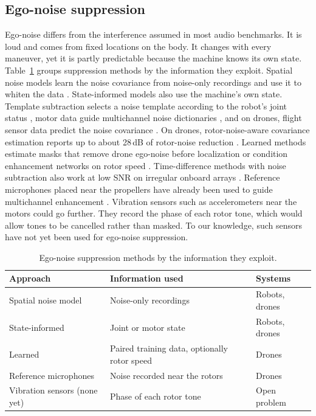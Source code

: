 \documentclass{svproc}
\begin{document}
\subsection{Ego-noise suppression}
Ego-noise differs from the interference assumed in most audio benchmarks.
It is loud and comes from fixed locations on the body.
It changes with every maneuver, yet it is partly predictable because the machine knows its own state.
Table~\ref{tab:egonoise} groups suppression methods by the information they exploit.
Spatial noise models learn the noise covariance from noise-only recordings and use it to whiten the data \cite{nakamura2011gevd,okutani2012quadrocopter}.
State-informed models also use the machine's own state.
Template subtraction selects a noise template according to the robot's joint status \cite{ince2009template}, motor data guide multichannel noise dictionaries \cite{schmidt2016dictionary,schmidt2018egonoise}, and on drones, flight sensor data predict the noise covariance \cite{furukawa2013ncm}.
On drones, rotor-noise-aware covariance estimation reports up to about 28\,dB of rotor-noise reduction \cite{yen2023ncm}.
Learned methods estimate masks that remove drone ego-noise before localization \cite{wang2022drone} or condition enhancement networks on rotor speed \cite{gulli2025rotor}.
Time-difference methods with noise subtraction also work at low SNR on irregular onboard arrays \cite{manamperi2022drone}.
Reference microphones placed near the propellers have already been used to guide multichannel enhancement \cite{tengan2022egonoise}.
Vibration sensors such as accelerometers near the motors could go further.
They record the phase of each rotor tone, which would allow tones to be cancelled rather than masked.
To our knowledge, such sensors have not yet been used for ego-noise suppression.

\begin{table}[t]
\renewcommand{\arraystretch}{1.05}
\centering
\scriptsize
\caption{Ego-noise suppression methods by the information they exploit.}
\label{tab:egonoise}
\begin{tabular}{|>{\raggedright\arraybackslash}p{3.8cm}|>{\raggedright\arraybackslash}p{5.5cm}|>{\raggedright\arraybackslash}p{2.4cm}|}
\hline
\textbf{Approach} & \textbf{Information used} & \textbf{Systems} \\
\hline
Spatial noise model \cite{nakamura2011gevd,okutani2012quadrocopter} & Noise-only recordings & Robots, drones \\
State-informed \cite{ince2009template,schmidt2016dictionary,schmidt2018egonoise,furukawa2013ncm,yen2023ncm} & Joint or motor state & Robots, drones \\
Learned \cite{wang2022drone,gulli2025rotor} & Paired training data, optionally rotor speed & Drones \\
Reference microphones \cite{tengan2022egonoise} & Noise recorded near the rotors & Drones \\
Vibration sensors (none yet) & Phase of each rotor tone & Open problem \\
\hline
\end{tabular}
\end{table}
\end{document}
